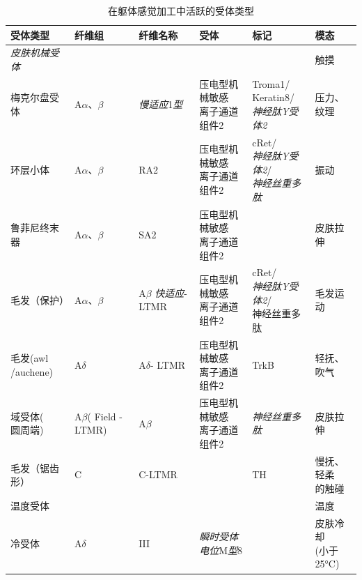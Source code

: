 \begin{table}[htbp]
	\caption{在躯体感觉加工中活跃的受体类型} \label{tab:18_2} \centering
	\begin{tabular}{llllll}
		\toprule
		受体类型 & 纤维组 & 纤维名称 & 受体 & 标记 & 模态\\
		\midrule
		\textit{皮肤机械受体} & &  &  &  & 触摸 \\
		梅克尔盘受体 & A$\alpha$、$\beta$ & \textit{慢适应}1\textit{型} & \makecell[l]{压电型机械敏感\\离子通道组件}2 & \makecell[l]{Troma1/\\Keratin8/\\\textit{神经肽Y受体2}} & \makecell[l]{压力、\\纹理} \\
		环层小体 & A$\alpha$、$\beta$ & RA2 & \makecell[l]{压电型机械敏感\\离子通道组件}2 & \makecell[l]{cRet/\\\textit{神经肽Y受体2}/\\\textit{神经丝重多肽}} & 振动 \\
		鲁菲尼终末器 & A$\alpha$、$\beta$ & SA2 & \makecell[l]{压电型机械敏感\\离子通道组件}2 &  & 皮肤拉伸 \\
		毛发（保护） & A$\alpha$、$\beta$ & A$\beta$ \textit{快适应}-LTMR & \makecell[l]{压电型机械敏感\\离子通道组件}2 & \makecell[l]{cRet/\\\textit{神经肽Y受体2}/\\神经丝重多肽} & 毛发运动 \\
		\makecell[l]{毛发(awl\\/auchene)} & A$\delta$ & \makecell[l]{A$\delta$-\\LTMR} & \makecell[l]{压电型机械敏感\\离子通道组件}2 & TrkB & 轻抚、吹气 \\
		\makecell[l]{域受体(\\圆周端)} & \makecell[l]{A$\beta$(\\Field\\-LTMR)} & A$\beta$ & \makecell[l]{压电型机械敏感\\离子通道组件}2 & \textit{神经丝重多肽} & 皮肤拉伸 \\
		毛发（锯齿形） & C & C-LTMR &  & TH & \makecell[l]{慢抚、轻柔\\的触碰} \\
		温度受体 &  &  &  &  & 温度 \\
		冷受体 & A$\delta$ & III & \textit{瞬时受体电位}M\textit{型}8 &  & \makecell[l]{皮肤冷却\\(小于 25°C)} \\

\end{tabular}
\end{table}
